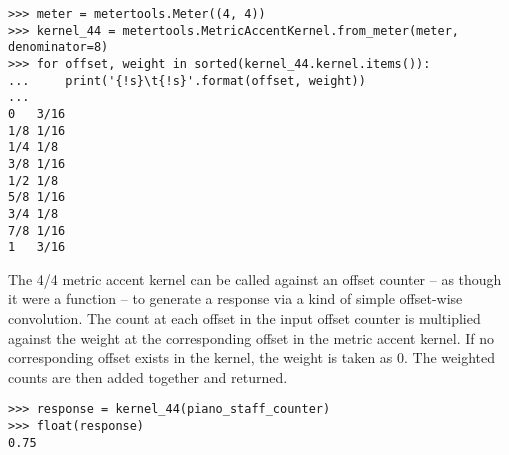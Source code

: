 \begin{singlespacing}
\vspace{-0.5\baselineskip}
\begin{lstlisting}
>>> meter = metertools.Meter((4, 4))
>>> kernel_44 = metertools.MetricAccentKernel.from_meter(meter, denominator=8)
>>> for offset, weight in sorted(kernel_44.kernel.items()):
...     print('{!s}\t{!s}'.format(offset, weight))
...
0	3/16
1/8	1/16
1/4	1/8
3/8	1/16
1/2	1/8
5/8	1/16
3/4	1/8
7/8	1/16
1	3/16
\end{lstlisting}
\end{singlespacing}

\noindent The 4/4 metric accent kernel can be called against an offset counter
-- as though it were a function -- to generate a response via a kind of simple
offset-wise convolution. The count at each offset in the input offset counter
is multiplied against the weight at the corresponding offset in the metric
accent kernel. If no corresponding offset exists in the kernel, the weight is
taken as 0. The weighted counts are then added together and returned.

\begin{comment}
<abjad>
response = kernel_44(piano_staff_counter)
float(response)
</abjad>
\end{comment}

\begin{singlespacing}
\vspace{-0.5\baselineskip}
\begin{lstlisting}
>>> response = kernel_44(piano_staff_counter)
>>> float(response)
0.75
\end{lstlisting}
\end{singlespacing}

\begin{comment}
<abjad>
total = Multiplier(0, 1)
for offset, count in sorted(piano_staff_counter.items()):
    weight = Multiplier(0, 1)
    if offset in kernel_44.kernel:
        weight = kernel_44.kernel[offset]
    weighted_count = weight * count
    total += weighted_count
    print(offset, count, weight, weighted_count, total)

</abjad>
\end{comment}

